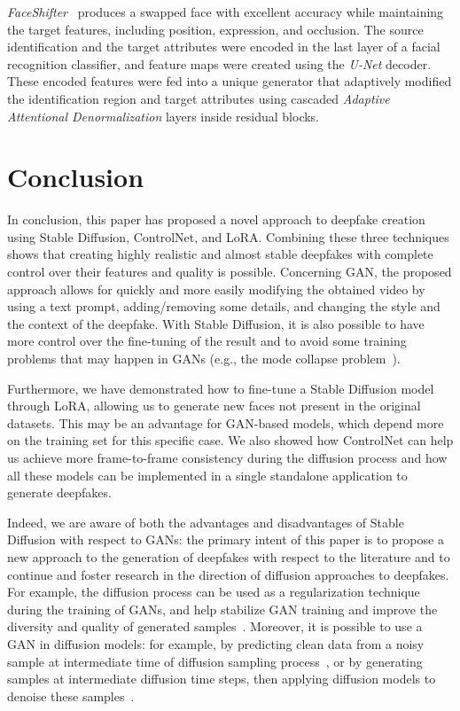 \documentclass[sn-mathphys,Numbered]{sn-jnl}
\theoremstyle{thmstyleone}%
\theoremstyle{thmstyletwo}%
\theoremstyle{thmstylethree}%
\begin{document}
\emph{FaceShifter}~\cite{faceshifter} produces a swapped face with excellent accuracy while maintaining the target features, including position, expression, and occlusion. The source identification and the target attributes were encoded in the last layer of a facial recognition classifier, and feature maps were created using the \emph{U-Net} decoder. These encoded features were fed into a unique generator that adaptively modified the identification region and target attributes using cascaded \emph{Adaptive Attentional Denormalization} layers inside residual blocks.



\section{Conclusion}\label{sect:conclusion}
In conclusion, this paper has proposed a novel approach to deepfake creation using Stable Diffusion, ControlNet, and LoRA. Combining these three techniques shows that creating highly realistic and almost stable deepfakes with complete control over their features and quality is possible. Concerning GAN, the proposed approach allows for quickly and more easily modifying the obtained video by  using a text prompt, adding/removing some details, and changing the style  and the context of the deepfake. With Stable Diffusion, it is also possible to have more control over the fine-tuning of the result and to avoid some training problems that may happen in GANs (e.g., the mode collapse problem~\cite{collapse}).


Furthermore, we have demonstrated how to fine-tune a Stable Diffusion model through LoRA,  allowing us to generate new faces not present in the original datasets. This may be an advantage for GAN-based models, which depend more on the training set for this specific case. We also showed how ControlNet can help us achieve more frame-to-frame consistency during the diffusion process and how all these models can be implemented in a single standalone application to generate deepfakes. 

Indeed, we are aware of both the advantages and disadvantages of Stable Diffusion with respect to GANs: the primary intent of this paper is to propose a new approach to the generation of deepfakes with respect to the literature and to continue and foster research in the direction of diffusion approaches to deepfakes. For example, the diffusion process can be used as a regularization technique during the training of GANs, and help stabilize GAN training and improve the diversity and quality of generated samples~\cite{mix}.
Moreover, it is possible to use a GAN  in diffusion models: for example, by predicting clean data from a noisy sample at intermediate time of diffusion sampling process~\cite{ganindiff1}, or by generating samples at intermediate diffusion time steps, then applying diffusion models to denoise these samples~\cite{ganindiff2}.
\end{document}
